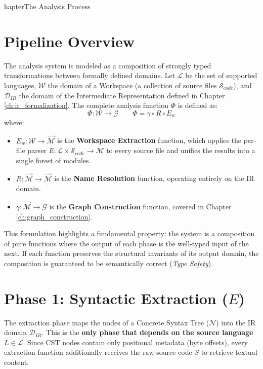 hapter{The Analysis Process}
\label{ch:analysis_process}

\section{Pipeline Overview}
\label{sec:pipeline_overview}

The analysis system is modeled as a composition of strongly typed transformations between formally defined domains. Let $\mathcal{L}$ be the set of supported languages, $\mathcal{W}$ the domain of a Workspace (a collection of source files $\mathcal{S}_{code}$), and $\mathcal{D}_{IR}$ the domain of the Intermediate Representation defined in Chapter \ref{ch:ir_formalization}. The complete analysis function $\Phi$ is defined as:
$$\Phi : \mathcal{W} \to \mathcal{G} \qquad \Phi = \gamma \circ R \circ E_w$$
where:
\begin{itemize}
  \item $E_w : \mathcal{W} \to \vec{\mathcal{M}}$ is the \textbf{Workspace Extraction} function, which applies the per-file parser $E : \mathcal{L} \times \mathcal{S}_{code} \to \mathcal{M}$ to every source file and unifies the results into a single forest of modules.
  \item $R : \vec{\mathcal{M}} \to \vec{\mathcal{M}}$ is the \textbf{Name Resolution} function, operating entirely on the IR domain.
  \item $\gamma : \vec{\mathcal{M}} \to \mathcal{G}$ is the \textbf{Graph Construction} function, covered in Chapter \ref{ch:graph_construction}.
\end{itemize}
This formulation highlights a fundamental property: the system is a composition of pure functions where the output of each phase is the well-typed input of the next. If each function preserves the structural invariants of its output domain, the composition is guaranteed to be semantically correct (\textit{Type Safety}).

\section{Phase 1: Syntactic Extraction ($E$)}
\label{sec:extraction}

The extraction phase maps the nodes of a Concrete Syntax Tree ($\mathcal{N}$) into the IR domain $\mathcal{D}_{IR}$. This is the \textbf{only phase that depends on the source language} $L \in \mathcal{L}$. Since CST nodes contain only positional metadata (byte offsets), every extraction function additionally receives the raw source code $S$ to retrieve textual content.


